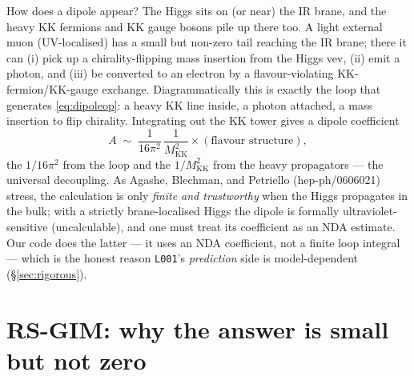 \documentclass[11pt]{article}
\newcommand{\MKK}{M_{\mathrm{KK}}}
\newcommand{\code}[1]{\texttt{#1}}
\theoremstyle{definition}
\begin{document}
How does a dipole appear? The Higgs sits on (or near) the IR brane, and the heavy
KK fermions and KK gauge bosons pile up there too. A light external muon
(UV-localised) has a small but non-zero tail reaching the IR brane; there it can
(i) pick up a chirality-flipping mass insertion from the Higgs vev, (ii) emit a
photon, and (iii) be converted to an electron by a flavour-violating
KK-fermion/KK-gauge exchange. Diagrammatically this is exactly the loop that
generates \eqref{eq:dipoleop}: a heavy KK line inside, a photon attached, a mass
insertion to flip chirality. Integrating out the KK tower gives a dipole
coefficient
\begin{equation}
A \;\sim\; \frac{1}{16\pi^2}\,\frac{1}{\MKK^2}\times(\text{flavour structure}),
\label{eq:Aparam}
\end{equation}
the $1/16\pi^2$ from the loop and the $1/\MKK^2$ from the heavy propagators ---
the universal decoupling. As Agashe, Blechman, and Petriello
(hep-ph/0606021) stress, the calculation is only \emph{finite and trustworthy}
when the Higgs propagates in the bulk; with a strictly brane-localised Higgs the
dipole is formally ultraviolet-sensitive (uncalculable), and one must treat its
coefficient as an NDA estimate. Our code does the latter --- it uses an NDA
coefficient, not a finite loop integral --- which is the honest reason
\code{L001}'s \emph{prediction} side is model-dependent
(\S\ref{sec:rigorous}).

\section{RS-GIM: why the answer is small but not zero}
\label{sec:rsgim}
\end{document}
